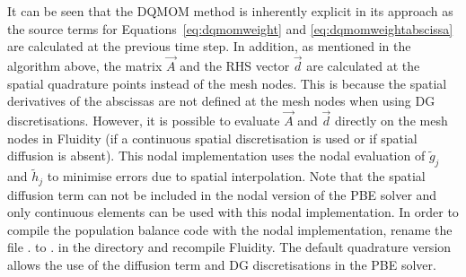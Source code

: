 It can be seen that the DQMOM method is inherently explicit in its approach as the source terms for Equations~\eqref{eq:dqmomweight} and \eqref{eq:dqmomweightabscissa} are calculated at the previous time step. 
In addition, as mentioned in the algorithm above, the matrix $\vec{A}$ and the RHS vector $\vec{d}$ are calculated at the spatial quadrature points instead of the mesh nodes. This is because the spatial derivatives of the abscissas are not defined at the mesh nodes when using DG discretisations.
However, it is possible to evaluate $\vec{A}$ and $\vec{d}$ directly on the mesh nodes in Fluidity (if a continuous spatial discretisation is used or if spatial diffusion is absent). This nodal implementation uses the nodal evaluation of $\widetilde{g}_j$ and $\widetilde{h}_j$ to minimise errors due to spatial interpolation.
Note that the spatial diffusion term can not be included in the nodal version of the PBE solver and only continuous elements can be used with this nodal implementation. In order to compile the population balance code with the nodal implementation, rename the file 
. to . in the  directory and recompile Fluidity.
The default quadrature version allows the use of the diffusion term and DG discretisations in the PBE solver.

